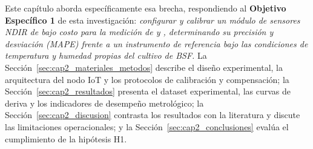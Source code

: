 Este capítulo aborda específicamente esa brecha, respondiendo al
\textbf{Objetivo Específico 1} de esta investigación:
\textit{configurar y calibrar un módulo de sensores NDIR de bajo costo
para la medición de  y , determinando su precisión y
desviación (MAPE) frente a un instrumento de referencia bajo las
condiciones de temperatura y humedad propias del cultivo de BSF.}
La Sección~\ref{sec:cap2_materiales_metodos} describe el diseño
experimental, la arquitectura del nodo IoT y los protocolos de
calibración y compensación; la
Sección~\ref{sec:cap2_resultados} presenta el dataset experimental,
las curvas de deriva y los indicadores de desempeño metrológico;
la Sección~\ref{sec:cap2_discusion} contrasta los resultados con la
literatura y discute las limitaciones operacionales; y la
Sección~\ref{sec:cap2_conclusiones} evalúa el cumplimiento de la
hipótesis H1.

